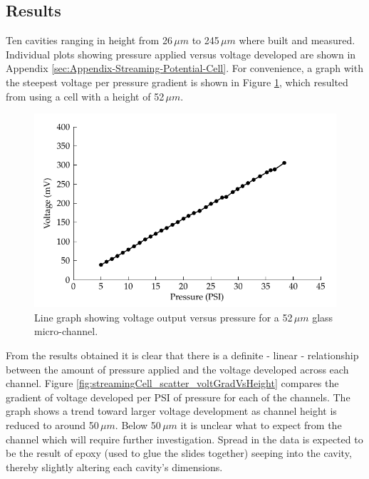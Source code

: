 \subsection{Results}

Ten cavities ranging in height from 26$\,\mu m$ to 245$\,\mu m$ where built and
measured. Individual plots showing pressure applied versus voltage developed
are shown in Appendix \ref{sec:Appendix-Streaming-Potential-Cell}.  For
convenience, a graph with the steepest voltage per pressure gradient is shown
in Figure \ref{fig:streamingCell_voltVsPress_52um_convienient}, which resulted
from using a cell with a height of 52$\,\mu m$.

\begin{figure}[H] \centering
    \includegraphics{content/pt1/01-PowerHarvesting/graphics/streamingCell_voltVsPress_52um_out}
    \caption{\label{fig:streamingCell_voltVsPress_52um_convienient}Line graph
        showing voltage output versus pressure for a 52$\,\mu m$ glass
        micro-channel.} \end{figure}


From the results obtained it is clear that there is a definite \nobreakdash-
linear \nobreakdash- relationship between the amount of pressure applied and
the voltage developed across each channel. Figure
\ref{fig:streamingCell_scatter_voltGradVsHeight} compares the gradient of
voltage developed per PSI of pressure for each of the channels. The graph shows
a trend toward larger voltage development as channel height is reduced to
around 50$\,\mu m$. Below 50$\,\mu m$ it is unclear what to expect from the
channel which will require further investigation. Spread in the data is
expected to be the result of epoxy (used to glue the slides together) seeping
into the cavity, thereby slightly altering each cavity's dimensions.


